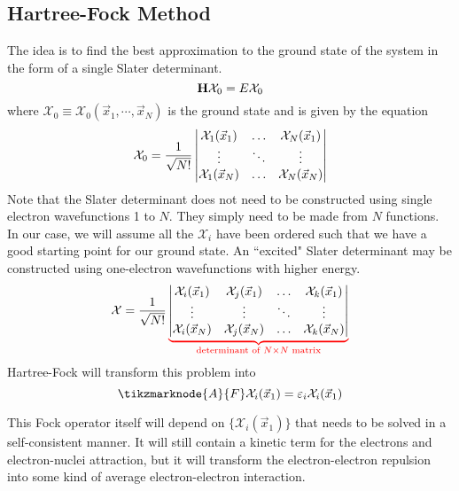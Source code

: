\documentclass[12pt,a4paper,titlepage]{article}
\newcommand{\trm}[1]{\textrm{#1}} %
\newcommand{\ul}[1]{\underline{\smash{#1}}} %
\newcommand{\Chi}{\mathcal{X}} %
\begin{document}
\subsection{Hartree-Fock Method}
The idea is to find the best approximation to the ground state of the system in the form of a single Slater determinant.
\begin{equation}
\vb{H}\Chi_{0}=E\Chi_{0}
\end{equation}
where $\Chi_{0}\equiv\Chi_{0}(\vec{x}_{1},\cdots,\vec{x}_{N})$ is the ground state and is given by the equation
\begin{equation}
\Chi_{0}=\frac{1}{\sqrt{N!}}\mdet{\Chi_{1}(\vec{x}_{1}) & \ldots & \Chi_{N}(\vec{x}_{1})\\ \vdots & \ddots & \vdots \\ \Chi_{1}(\vec{x}_{N}) & \ldots & \Chi_{N}(\vec{x}_{N})}
\end{equation}
Note that the Slater determinant does not need to be constructed using single electron wavefunctions 1 to $N$. They simply need to be made from \ul{any} $N$ functions. In our case, we will assume all the $\Chi_{i}$ have been ordered such that we have a good starting point for our ground state. An ``excited" Slater determinant may be constructed using one-electron wavefunctions with higher energy.
\begin{equation}
\Chi=\frac{1}{\sqrt{N!}}\color{red}\underbrace{\color{black}\mdet{\Chi_{i}(\vec{x}_{1}) & \Chi_{j}(\vec{x}_{1}) & \ldots & \Chi_{k}(\vec{x}_{1})\\ \vdots & \vdots & \ddots & \vdots \\ \Chi_{i}(\vec{x}_{N}) & \Chi_{j}(\vec{x}_{N}) & \ldots & \Chi_{k}(\vec{x}_{N})}}_{\trm{determinant of }N\times N\trm{ matrix}}
\end{equation}
Hartree-Fock will transform this problem into
\begin{equation}
\tikzmarknode{A}{F}\Chi_{i}(\vec{x}_{1})=\varepsilon_{i}\Chi_{i}(\vec{x}_{1})
\end{equation}

This Fock operator itself will depend on $\{\Chi_{i}(\vec{x}_{1})\}$ that needs to be solved in a self-consistent manner. It will still contain a kinetic term for the electrons and electron-nuclei attraction, but it will transform the electron-electron repulsion into some kind of average electron-electron interaction.
\end{document}
